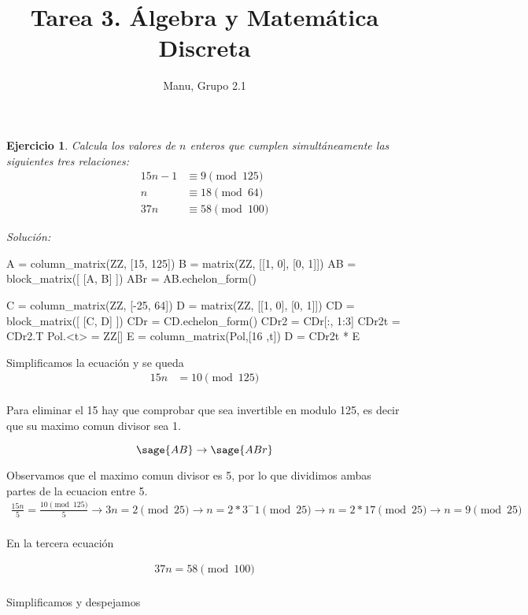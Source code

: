 \documentclass{amsart}
\title{Tarea 3. Álgebra y Matemática Discreta}
\author{Manu, Grupo 2.1}
\newtheorem{ejer}{Ejercicio}
\begin{document}
\maketitle

\begin{ejer}
Calcula los valores de $n$ enteros que cumplen simultáneamente las siguientes
tres relaciones:
\begin{align*}
15n-1 &\equiv 9 \pmod{125} \\
n     &\equiv 18 \pmod{64} \\
37n   &\equiv 58 \pmod{100}
\end{align*}
\end{ejer}

{\it Solución: }

\begin{sageblock}
A = column_matrix(ZZ, [15, 125])
B = matrix(ZZ, [[1, 0], [0, 1]])
AB = block_matrix([ [A, B] ])
ABr = AB.echelon_form()

C = column_matrix(ZZ, [-25, 64])
D = matrix(ZZ, [[1, 0], [0, 1]])
CD = block_matrix([ [C, D] ])
CDr = CD.echelon_form()
CDr2 = CDr[:, 1:3]
CDr2t = CDr2.T
Pol.<t> = ZZ[]
E = column_matrix(Pol,[16 ,t])
D = CDr2t * E
\end{sageblock}
	
Simplificamos la ecuación y se queda
\begin{align*}
15n &= 10 \pmod{125}\\
\end{align*}

Para eliminar el 15 hay que comprobar que sea invertible en modulo 125, es decir que su maximo comun divisor sea 1.

\[\sage{AB} \to \sage{ABr} \]

Observamos que el maximo comun divisor es 5, por lo que dividimos ambas partes de la ecuacion entre 5.
\begin{align*}
\frac{15n}{5} = \frac{10 \pmod{125} }{5} \to 3n = 2 \pmod{25} \to n = 2 * 3^-1 \pmod{25} \to n = 2*17 \pmod{25} \to n = 9 \pmod{25}\\
\end{align*}

En la tercera ecuación


\begin{align*}
37n = 58 \pmod{100}\\
\end{align*}

Simplificamos y despejamos
\end{document}
